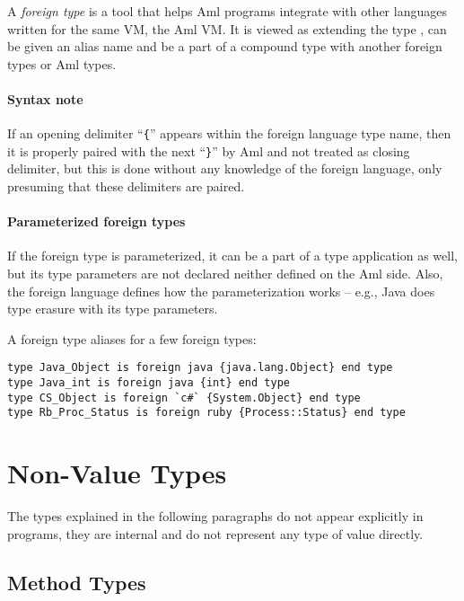 A {\em foreign type} is a tool that helps Aml programs integrate with other languages written for the same VM, the Aml VM. It is viewed as extending the type , can be given an alias name and be a part of a compound type with another foreign types or Aml types. 

\paragraph{Syntax note}
If an opening delimiter ``\lstinline!{!'' appears within the foreign language type name, then it is properly paired with the next ``\lstinline!}!'' by Aml and not treated as closing delimiter, but this is done without any knowledge of the foreign language, only presuming that these delimiters are paired. 

\paragraph{Parameterized foreign types}
If the foreign type is parameterized, it can be a part of a type application as well, but its type parameters are not declared neither defined on the Aml side. Also, the foreign language defines how the parameterization works -- e.g., Java does type erasure with its type parameters.

\example A foreign type aliases for a few foreign types:
\begin{lstlisting}
type Java_Object is foreign java {java.lang.Object} end type
type Java_int is foreign java {int} end type
type CS_Object is foreign `c#` {System.Object} end type
type Rb_Proc_Status is foreign ruby {Process::Status} end type
\end{lstlisting}







\section{Non-Value Types}

The types explained in the following paragraphs do not appear explicitly in programs, they are internal and do not represent any type of value directly. 






\subsection{Method Types}
\label{sec:method-types}

